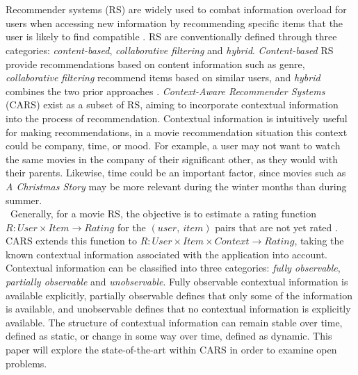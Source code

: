 \chapter*{}\label{ch:introduction}
Recommender systems (RS) are widely used to combat information overload for users when accessing new information by recommending specific items that the user is likely to find compatible \cite{YouTubeNeural,IndustryPerspective}.
RS are conventionally defined through three categories: \textit{content-based}, \textit{collaborative filtering} and \textit{hybrid}.
\textit{Content-based} RS provide recommendations based on content information such as genre, \textit{collaborative filtering} recommend items based on similar users, and \textit{hybrid} combines the two prior approaches \cite{ContextSurvey2020}.
\textit{Context-Aware Recommender Systems} (CARS) exist as a subset of RS, aiming to incorporate contextual information into the process of recommendation.
Contextual information is intuitively useful for making recommendations, in a movie recommendation situation this context could be company, time, or mood.
For example, a user may not want to watch the same movies in the company of their significant other, as they would with their parents.
Likewise, time could be an important factor, since movies such as \textit{A Christmas Story} may be more relevant during the winter months than during summer.\\\
Generally, for a movie RS, the objective is to estimate a rating function $R: User \times Item \rightarrow Rating$ for the $(user, \ item)$ pairs that are not yet rated \cite[p.~191-227]{RecommenderHandbook2015}.
CARS extends this function to $R: User \times Item \times Context \rightarrow Rating$, taking the known contextual information associated with the application into account.
Contextual information can be classified into three categories: \textit{fully observable}, \textit{partially observable} and \textit{unobservable}.
Fully observable contextual information is available explicitly, partially observable defines that only some of the information is available, and unobservable defines that no contextual information is explicitly available.
The structure of contextual information can remain stable over time, defined as static, or change in some way over time, defined as dynamic.
This paper will explore the state-of-the-art within CARS in order to examine open problems.
